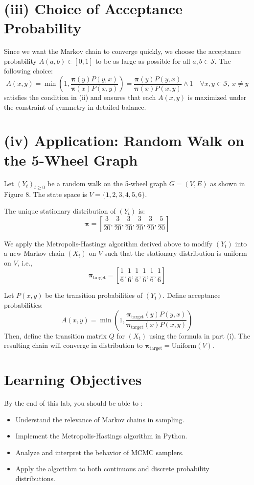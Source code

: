\documentclass[12pt]{article}
\newcommand{\calS}{\mathcal S}
\begin{document}
	\section*{(iii) Choice of Acceptance Probability}
	
	Since we want the Markov chain to converge quickly, we choose the acceptance probability $A(a, b) \in [0, 1]$ to be as large as possible for all $a, b \in \calS$. The following choice:
	\[
	A(x, y) = \min\left(1, \frac{\bm\pi(y) P(y, x)}{\bm\pi(x) P(x, y)}\right) = \frac{\bm\pi(y) P(y, x)}{\bm\pi(x) P(x, y)} \wedge 1
	\quad \forall x, y \in \calS,\ x \neq y
	\]
	satisfies the condition in (ii) and ensures that each $A(x, y)$ is maximized under the constraint of symmetry in detailed balance.
	
	\section*{(iv) Application: Random Walk on the 5-Wheel Graph}
	
	Let $(Y_t)_{t \geq 0}$ be a random walk on the 5-wheel graph $G = (V, E)$ as shown in Figure 8. The state space is $V = \{1, 2, 3, 4, 5, 6\}$.
	
	The unique stationary distribution of $(Y_t)$ is:
	\[
	\bm\pi = \left[ \frac{3}{20}, \frac{3}{20}, \frac{3}{20}, \frac{3}{20}, \frac{3}{20}, \frac{5}{20} \right]
	\]
	
	We apply the Metropolis-Hastings algorithm derived above to modify $(Y_t)$ into a new Markov chain $(X_t)$ on $V$ such that the stationary distribution is uniform on $V$, i.e.,
	\[
	\bm\pi_{\text{target}} = \left[ \frac{1}{6}, \frac{1}{6}, \frac{1}{6}, \frac{1}{6}, \frac{1}{6}, \frac{1}{6} \right]
	\]
	
	Let $P(x, y)$ be the transition probabilities of $(Y_t)$. Define acceptance probabilities:
	\[
	A(x, y) = \min\left(1, \frac{\bm\pi_{\text{target}}(y) P(y, x)}{\bm\pi_{\text{target}}(x) P(x, y)}\right)
	\]
	Then, define the transition matrix $Q$ for $(X_t)$ using the formula in part (i). The resulting chain will converge in distribution to $\bm\pi_{\text{target}} = \text{Uniform}(V)$.
	
	
	
	
	
	\section*{Learning Objectives}
	By the end of this lab, you should be able to :
	\begin{itemize}
		\item Understand the relevance of Markov chains in sampling.
		\item Implement the Metropolis-Hastings algorithm in Python.
		\item Analyze and interpret the behavior of MCMC samplers.
		\item Apply the algorithm to both continuous and discrete probability distributions.
	\end{itemize}
	
\end{document}
